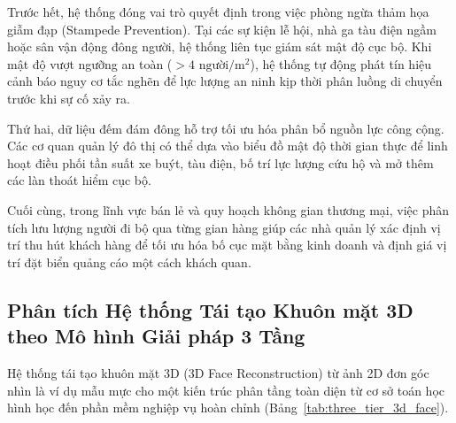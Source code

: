 Trước hết, hệ thống đóng vai trò quyết định trong việc phòng ngừa thảm họa giẫm đạp (Stampede Prevention). Tại các sự kiện lễ hội, nhà ga tàu điện ngầm hoặc sân vận động đông người, hệ thống liên tục giám sát mật độ cục bộ. Khi mật độ vượt ngưỡng an toàn ($>4\text{ người}/\text{m}^2$), hệ thống tự động phát tín hiệu cảnh báo nguy cơ tắc nghẽn để lực lượng an ninh kịp thời phân luồng di chuyển trước khi sự cố xảy ra.

Thứ hai, dữ liệu đếm đám đông hỗ trợ tối ưu hóa phân bổ nguồn lực công cộng. Các cơ quan quản lý đô thị có thể dựa vào biểu đồ mật độ thời gian thực để linh hoạt điều phối tần suất xe buýt, tàu điện, bố trí lực lượng cứu hộ và mở thêm các làn thoát hiểm cục bộ.

Cuối cùng, trong lĩnh vực bán lẻ và quy hoạch không gian thương mại, việc phân tích lưu lượng người đi bộ qua từng gian hàng giúp các nhà quản lý xác định vị trí thu hút khách hàng để tối ưu hóa bố cục mặt bằng kinh doanh và định giá vị trí đặt biển quảng cáo một cách khách quan.

\subsection{Phân tích Hệ thống Tái tạo Khuôn mặt 3D theo Mô hình Giải pháp 3 Tầng}

Hệ thống tái tạo khuôn mặt 3D (3D Face Reconstruction) từ ảnh 2D đơn góc nhìn là ví dụ mẫu mực cho một kiến trúc phân tầng toàn diện từ cơ sở toán học hình học đến phần mềm nghiệp vụ hoàn chỉnh (Bảng~\ref{tab:three_tier_3d_face}).

